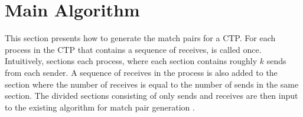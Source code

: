 \section{Main Algorithm}


This section presents how to generate the match pairs for a CTP. For each process in the CTP that contains a sequence of receives,  is called once. 
Intuitively,  sections each process, where each section contains roughly $k$ sends from each sender. A sequence of receives in the process is also added to the section where the number of receives is equal to the number of sends in the same section.
The divided sections consisting of only sends and receives are then input to the existing algorithm for match pair generation \cite{DBLP:conf/kbse/HuangMM13}. 


\begin{comment}
Sections = {}
cur = {}

while | R | \neq 0 {
  r = dequeue(R);
  S = ()
  if from(r) = * 
     Let S be such that \forall S' \in {S_i, S_j, ...} (count(S) \lte count(S’)) and | S | \neq 0)
	  count(S) += 1
  else
     Let S be such that S = Sender(r)

  cur = cur \cup {r, dequeue(S)}
  if \forall S \in {S_i, S_j, ...} (count(S) = k \vee |S| = 0 \vee | R | = 0)
     Sections  = Sections \cup {cur}
	  cur = {}
	  \forall S \in {S_i, S_j, ...} count(S) = 0;
}
\end{comment}


